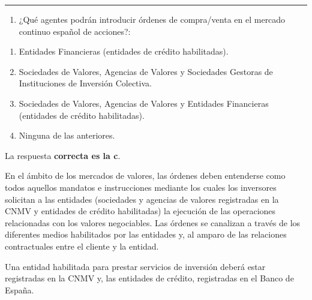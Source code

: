 \documentclass[
  letterpaper,
  DIV=11,
  numbers=noendperiod]{scrreprt}
\providecommand{\tightlist}{%
  \setlength{\itemsep}{0pt}\setlength{\parskip}{0pt}}\usepackage{longtable,booktabs,array}
\begin{document}
\begin{center}\rule{0.5\linewidth}{0.5pt}\end{center}

\begin{enumerate}
\def\labelenumi{\arabic{enumi}.}
\setcounter{enumi}{9}
\tightlist
\item
  ¿Qué agentes podrán introducir órdenes de compra/venta en el mercado
  continuo español de acciones?:
\end{enumerate}

\begin{enumerate}
\def\labelenumi{\alph{enumi})}
\item
  Entidades Financieras (entidades de crédito habilitadas).
\item
  Sociedades de Valores, Agencias de Valores y Sociedades Gestoras de
  Instituciones de Inversión Colectiva.
\item
  Sociedades de Valores, Agencias de Valores y Entidades Financieras
  (entidades de crédito habilitadas).
\item
  Ninguna de las anteriores.
\end{enumerate}

\begin{tcolorbox}[enhanced jigsaw, left=2mm, opacityback=0, colback=white, breakable, arc=.35mm, bottomrule=.15mm, rightrule=.15mm, toprule=.15mm, leftrule=.75mm, colframe=quarto-callout-tip-color-frame]
\begin{minipage}[t]{5.5mm}
\textcolor{quarto-callout-tip-color}{\faLightbulb}
\end{minipage}%
\begin{minipage}[t]{\textwidth - 5.5mm}

La respuesta \textbf{correcta es la c}.

En el ámbito de los mercados de valores, las órdenes deben entenderse
como todos aquellos mandatos e instrucciones mediante los cuales los
inversores solicitan a las entidades (sociedades y agencias de valores
registradas en la CNMV y entidades de crédito habilitadas) la ejecución
de las operaciones relacionadas con los valores negociables. Las órdenes
se canalizan a través de los diferentes medios habilitados por las
entidades y, al amparo de las relaciones contractuales entre el cliente
y la entidad.

Una entidad habilitada para prestar servicios de inversión deberá estar
registradas en la CNMV y, las entidades de crédito, registradas en el
Banco de España.

\end{minipage}%
\end{tcolorbox}
\end{document}
